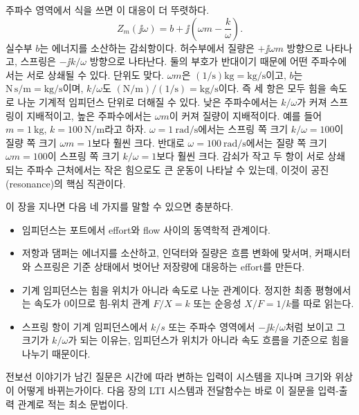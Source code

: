 주파수 영역에서 식을 쓰면 이 대응이 더 뚜렷하다.
\begin{equation}
  Z_m(\jj\omega) = b + \jj\left(\omega m - \frac{k}{\omega}\right).
\end{equation}
실수부 $b$는 에너지를 소산하는 감쇠항이다.
허수부에서 질량은 $+\jj\omega m$ 방향으로 나타나고, 스프링은 $-\jj k/\omega$ 방향으로 나타난다.
둘의 부호가 반대이기 때문에 어떤 주파수에서는 서로 상쇄될 수 있다.
단위도 맞다.
$\omega m$은 $(1/\mathrm{s})\mathrm{kg}=\mathrm{kg/s}$이고, $b$는 $\mathrm{N\,s/m}=\mathrm{kg/s}$이며, $k/\omega$도 $(\mathrm{N/m})/(1/\mathrm{s})=\mathrm{kg/s}$이다.
즉 세 항은 모두 힘을 속도로 나눈 기계적 임피던스 단위로 더해질 수 있다.
낮은 주파수에서는 $k/\omega$가 커져 스프링이 지배적이고, 높은 주파수에서는 $\omega m$이 커져 질량이 지배적이다.
예를 들어 $m=1~\mathrm{kg}$, $k=100~\mathrm{N/m}$라고 하자.
$\omega=1~\mathrm{rad/s}$에서는 스프링 쪽 크기 $k/\omega=100$이 질량 쪽 크기 $\omega m=1$보다 훨씬 크다.
반대로 $\omega=100~\mathrm{rad/s}$에서는 질량 쪽 크기 $\omega m=100$이 스프링 쪽 크기 $k/\omega=1$보다 훨씬 크다.
감쇠가 작고 두 항이 서로 상쇄되는 주파수 근처에서는 작은 힘으로도 큰 운동이 나타날 수 있는데, 이것이 공진(resonance)의 핵심 직관이다.

이 장을 지나면 다음 네 가지를 말할 수 있으면 충분하다.
\begin{itemize}
  \item 임피던스는 포트에서 effort와 flow 사이의 동역학적 관계이다.
  \item 저항과 댐퍼는 에너지를 소산하고, 인덕터와 질량은 흐름 변화에 맞서며, 커패시터와 스프링은 기준 상태에서 벗어난 저장량에 대응하는 effort를 만든다.
  \item 기계 임피던스는 힘을 위치가 아니라 속도로 나눈 관계이다. 정지한 최종 평형에서는 속도가 0이므로 힘-위치 관계 $F/X=k$ 또는 순응성 $X/F=1/k$를 따로 읽는다.
  \item 스프링 항이 기계 임피던스에서 $k/s$ 또는 주파수 영역에서 $-\jj k/\omega$처럼 보이고 그 크기가 $k/\omega$가 되는 이유는, 임피던스가 위치가 아니라 속도 흐름을 기준으로 힘을 나누기 때문이다.
\end{itemize}

전보선 이야기가 남긴 질문은 시간에 따라 변하는 입력이 시스템을 지나며 크기와 위상이 어떻게 바뀌는가이다.
다음 장의 LTI 시스템과 전달함수는 바로 이 질문을 입력-출력 관계로 적는 최소 문법이다.
